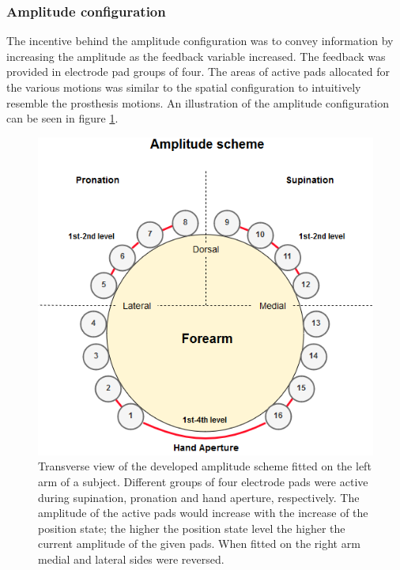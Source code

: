 \subsubsection{Amplitude configuration}
The incentive behind the amplitude configuration was to convey information by increasing the amplitude as the feedback variable increased. The feedback was provided in electrode pad groups of four.
The areas of active pads allocated for the various motions was similar to the spatial configuration to intuitively resemble the prosthesis motions. An illustration of the amplitude configuration can be seen in figure \ref{fig:pa:amplitude}. 
 \begin{figure}[h]                 
	\includegraphics[width=.9\textwidth]{figures/El_array_amplitude}  
	\caption{Transverse view of the developed amplitude scheme fitted on the left arm of a subject. Different groups of four electrode pads were active during supination, pronation and hand aperture, respectively. The amplitude of the active pads would increase with the increase of the position state; the higher the position state level the higher the current amplitude of the given pads. When fitted on the right arm medial and lateral sides were reversed.}
	\label{fig:pa:amplitude} 
\end{figure}

